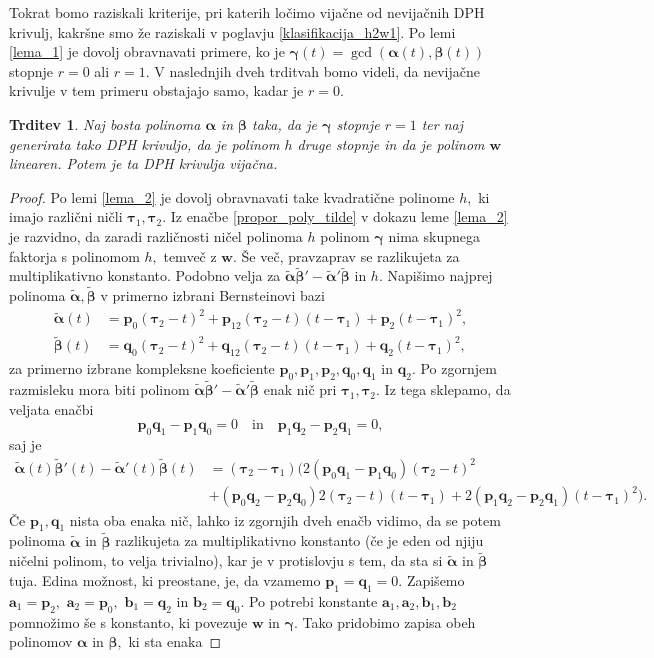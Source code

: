 \documentclass[12pt,a4paper,twoside]{article}
\theoremstyle{definition} %
\theoremstyle{plain} %
\newtheorem{trditev}[definicija]{Trditev}
\theoremstyle{primerstyle}
\numberwithin{equation}{section}  %
\newcommand{\aV}{\mathbf{a}}
\newcommand{\bV}{\mathbf{b}}
\newcommand{\pV}{\mathbf{p}}
\newcommand{\qV}{\mathbf{q}}
\newcommand{\wV}{\mathbf{w}}
\newcommand{\balpha}{\boldsymbol \alpha}
\newcommand{\bbeta}{\boldsymbol \beta}
\newcommand{\bgamma}{\boldsymbol \gamma}
\newcommand{\btau}{\boldsymbol \tau}
\newcommand{\btalpha}{\tilde{\boldsymbol \alpha}}
\newcommand{\btbeta}{\tilde{\boldsymbol \beta}}
\begin{document}
Tokrat bomo raziskali kriterije, pri katerih ločimo vijačne od nevijačnih DPH krivulj, kakršne smo že raziskali v poglavju \ref{klasifikacija_h2w1}. Po lemi \ref{lema_1} je dovolj obravnavati primere, ko je $\bgamma(t)=\gcd(\balpha(t),\bbeta(t))$ stopnje $r=0$ ali $r=1.$ V naslednjih dveh trditvah bomo videli, da nevijačne krivulje v tem primeru obstajajo samo, kadar je $r=0.$
\begin{trditev}
	\label{locevanje_h2w1_trditev1}
	Naj bosta polinoma $\balpha$ in $\bbeta$ taka, da je $\bgamma$ stopnje $r=1$ ter naj generirata tako DPH krivuljo, da je polinom $h$ druge stopnje in da je polinom $\wV$ linearen. Potem je ta DPH krivulja vijačna.
\end{trditev}
\begin{proof}
	Po lemi \ref{lema_2} je dovolj obravnavati take kvadratične polinome $h,$ ki imajo različni ničli $\btau_1,\btau_2.$ Iz enačbe \eqref{propor_poly_tilde} v dokazu leme \ref{lema_2} je razvidno, da zaradi različnosti ničel polinoma $h$ polinom $\bgamma$ nima skupnega faktorja s polinomom $h,$ temveč z $\wV.$ Še več, pravzaprav se razlikujeta za multiplikativno konstanto. Podobno velja za $\btalpha\btbeta'-\btalpha'\btbeta$ in $h.$ Napišimo najprej polinoma $\btalpha,\btbeta$ v primerno izbrani Bernsteinovi bazi
	\begin{align*}
		\btalpha(t)&=\pV_0(\btau_2-t)^2+\pV_12(\btau_2-t)(t-\btau_1)+\pV_2(t-\btau_1)^2,\\
		\btbeta(t)&=\qV_0(\btau_2-t)^2+\qV_12(\btau_2-t)(t-\btau_1)+\qV_2(t-\btau_1)^2,
	\end{align*}
	za primerno izbrane kompleksne koeficiente $\pV_0,\pV_1,\pV_2,\qV_0,\qV_1$ in $\qV_2.$ Po zgornjem razmisleku mora biti polinom $\btalpha\btbeta'-\btalpha'\btbeta$ enak nič pri $\btau_1,\btau_2.$ Iz tega sklepamo, da veljata enačbi
	\begin{equation*}
		\pV_0\qV_1-\pV_1\qV_0=0\quad\text{in}\quad\pV_1\qV_2-\pV_2\qV_1=0,
	\end{equation*}
	saj je
	\begin{align*}
		\btalpha(t)\btbeta'(t)-\btalpha'(t)\btbeta(t)&=(\btau_2-\btau_1)\big(2(\pV_0\qV_1-\pV_1\qV_0)(\btau_2-t)^2\\
		&+(\pV_0\qV_2-\pV_2\qV_0)2(\btau_2-t)(t-\btau_1)
		+2(\pV_1\qV_2-\pV_2\qV_1)(t-\btau_1)^2\big).
	\end{align*}
	Če $\pV_1,\qV_1$ nista oba enaka nič, lahko iz zgornjih dveh enačb vidimo, da se potem polinoma $\btalpha$ in $\btbeta$ razlikujeta za multiplikativno konstanto (če je eden od njiju ničelni polinom, to velja trivialno), kar je v protislovju s tem, da sta si $\btalpha$ in $\btbeta$ tuja. Edina možnost, ki preostane, je, da vzamemo $\pV_1=\qV_1=0.$ Zapišemo $\aV_1=\pV_2,$ $\aV_2=\pV_0,$ $\bV_1=\qV_2$ in $\bV_2=\qV_0.$ Po potrebi konstante $\aV_1,\aV_2,\bV_1,\bV_2$ pomnožimo še s konstanto, ki povezuje $\wV$ in $\bgamma$. Tako pridobimo zapisa obeh polinomov $\balpha$ in $\bbeta,$ ki sta enaka

\end{proof}
\end{document}
